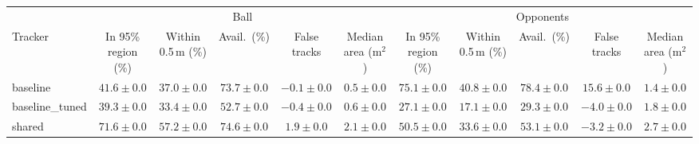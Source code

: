 \begin{tabular}{lcccccccccc}
\toprule
 & \multicolumn{5}{c}{Ball} & \multicolumn{5}{c}{Opponents} \\
\cmidrule(lr){2-6}\cmidrule(lr){7-11}
Tracker & In 95\% region (\%) & Within 0.5\,m (\%) & Avail.\ (\%) & False tracks & Median area (m$^2$) & In 95\% region (\%) & Within 0.5\,m (\%) & Avail.\ (\%) & False tracks & Median area (m$^2$) \\
\midrule
baseline & $41.6 \pm 0.0$ & $37.0 \pm 0.0$ & $73.7 \pm 0.0$ & $-0.1 \pm 0.0$ & $0.5 \pm 0.0$ & $75.1 \pm 0.0$ & $40.8 \pm 0.0$ & $78.4 \pm 0.0$ & $15.6 \pm 0.0$ & $1.4 \pm 0.0$ \\
baseline\_tuned & $39.3 \pm 0.0$ & $33.4 \pm 0.0$ & $52.7 \pm 0.0$ & $-0.4 \pm 0.0$ & $0.6 \pm 0.0$ & $27.1 \pm 0.0$ & $17.1 \pm 0.0$ & $29.3 \pm 0.0$ & $-4.0 \pm 0.0$ & $1.8 \pm 0.0$ \\
shared & $71.6 \pm 0.0$ & $57.2 \pm 0.0$ & $74.6 \pm 0.0$ & $1.9 \pm 0.0$ & $2.1 \pm 0.0$ & $50.5 \pm 0.0$ & $33.6 \pm 0.0$ & $53.1 \pm 0.0$ & $-3.2 \pm 0.0$ & $2.7 \pm 0.0$ \\
\bottomrule
\end{tabular}
